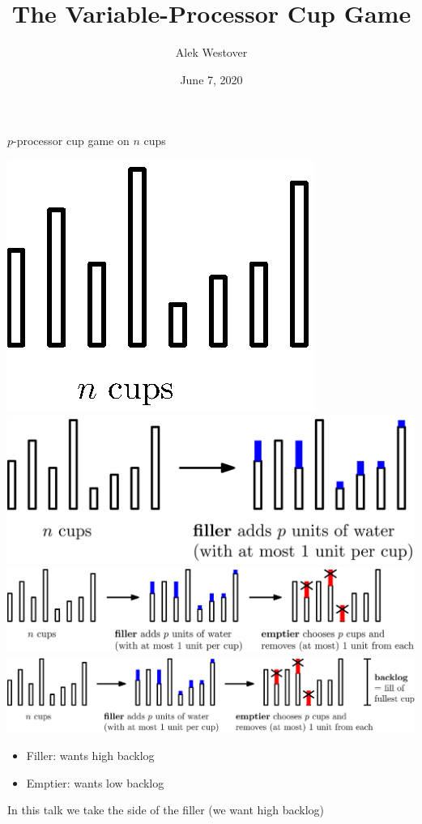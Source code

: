 \documentclass[xcolor=x11names, svgnames, rgb]{beamer}
\title{The Variable-Processor Cup Game}
\author{Alek Westover}
\institute{Belmont High School}
\date{June 7, 2020}
\begin{document}
 
\frame{\titlepage}

\begin{frame}[c]{$p$-processor cup game on $n$ cups}
  \begin{overprint}
     \includegraphics[width=\linewidth]{initDef/initDef0.eps}
     \includegraphics[width=\linewidth]{initDef/initDef1.eps}
     \includegraphics[width=\linewidth]{initDef/initDef2.eps}
     \includegraphics[width=\linewidth]{initDef/initDef3.eps}
  \end{overprint}
  \begin{overprint}
     {
      \begin{itemize}
        \item Filler: wants high backlog 
        \item Emptier: wants low backlog
      \end{itemize}
      In this talk we take the side of the filler
      (we want high backlog)
    }
  \end{overprint}
\end{frame}
\end{document}
